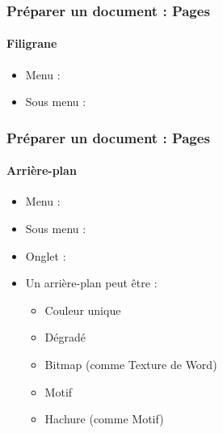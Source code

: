 \documentclass[xcolor=table]{beamer}
\begin{document}
\begin{frame}[t]
\frametitle{Préparer un document : Pages}
\framesubtitle{Filigrane}

\begin{minipage}{0.43\textwidth}
	\begin{itemize}
		\item Menu :  
		\item Sous menu : 
	\end{itemize}
\end{minipage}
\begin{minipage}{0.55\textwidth}
\end{minipage}

\end{frame}

\begin{frame}[t]
\frametitle{Préparer un document : Pages}
\framesubtitle{Arrière-plan}

\begin{minipage}{0.43\textwidth}
	\begin{itemize}
		\item Menu :  
		\item Sous menu : 
		\item Onglet : 
		\item Un arrière-plan peut être : 
		\begin{itemize}
			\item Couleur unique
			\item Dégradé
			\item Bitmap (comme Texture de Word)
			\item Motif
			\item Hachure (comme Motif)
		\end{itemize}
	\end{itemize}
\end{minipage}
\begin{minipage}{0.55\textwidth}
\end{minipage}

\end{frame}
\end{document}
